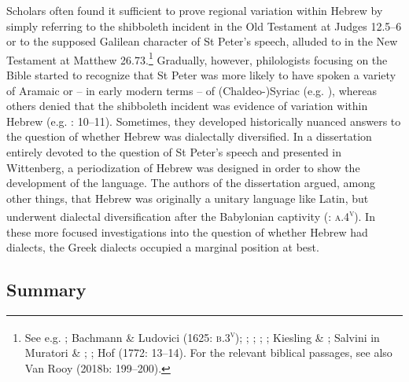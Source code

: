 Scholars often found it sufficient to prove regional variation within Hebrew by simply referring to the shibboleth incident in the Old Testament at Judges 12.5–6 or to the supposed Galilean character of St Peter’s speech, alluded to in the New Testament at Matthew 26.73.\footnote{See e.g. \citet[6]{Bovelles1533}; Bachmann \& Ludovici (1625: \textsc{b.3}\textsc{\textsuperscript{v}}); \citet[102]{Weemes1632}; \citet[2]{Wyss1650}; \citet[18]{Walton1657}; \citet[180]{Webb1669}; Kiesling \& \citet[6]{Bause1712}; Salvini in Muratori \& \citet[103]{Salvini1724}; \citet[30]{Hauptmann1751}; Hof (1772: 13–14). For the relevant biblical passages, see also Van Rooy (2018b: 199–200).} Gradually, however, philologists focusing on the Bible started to recognize that St Peter was more likely to have spoken a variety of Aramaic or – in early modern terms – of (Chaldeo-)Syriac (e.g. \citealt{PfeifferMartini1663}), whereas others denied that the shibboleth incident was evidence of variation within Hebrew (e.g. \citealt{Mayer1629}: 10–11). Sometimes, they developed historically nuanced answers to the question of whether Hebrew was dialectally diversified. In a dissertation entirely devoted to the question of St Peter’s speech and presented in Wittenberg, a periodization of Hebrew was designed in order to show the development of the language. The authors of the dissertation argued, among other things, that Hebrew was originally a unitary language like Latin, but underwent dialectal diversification after the Babylonian captivity (\citealt{PfeifferMartini1663}: \textsc{a.4}\textsc{\textsuperscript{v}}). In these more focused investigations into the question of whether Hebrew had dialects, the Greek dialects occupied a marginal position at best.

\subsection{Summary}

